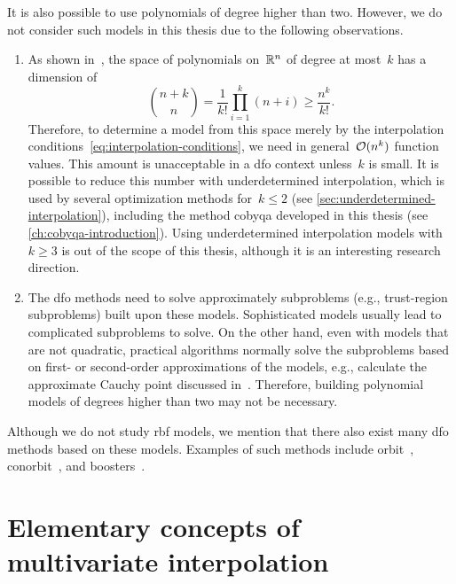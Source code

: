 It is also possible to use polynomials of degree higher than two.
However, we do not consider such models in this thesis due to the following observations.
\begin{enumerate}
    \item As shown in~\cite[Thm.~2.5]{Wendland_2005}, the space of polynomials on~$\mathbb{R}^n$ of degree at most~$k$ has a dimension of
    \begin{equation*}
        \binom{n + k}{n} = \frac{1}{k!} \prod_{i = 1}^k (n + i) \ge \frac{n^k}{k!}.
    \end{equation*}
    Therefore, to determine a model from this space merely by the interpolation conditions~\cref{eq:interpolation-conditions}, we need in general~$\operatorname{\mathcal{O}}(n^k)$ function values.
    This amount is unacceptable in a \gls{dfo} context unless~$k$ is small.
    It is possible to reduce this number with underdetermined interpolation, which is used by several optimization methods for~$k \le 2$ (see \cref{sec:underdetermined-interpolation}), including the method \gls{cobyqa} developed in this thesis (see \cref{ch:cobyqa-introduction}).
    Using underdetermined interpolation models with~$k \ge 3$ is out of the scope of this thesis, although it is an interesting research direction.
    \item The \gls{dfo} methods need to solve approximately subproblems (e.g., trust-region subproblems) built upon these models.
    Sophisticated models usually lead to complicated subproblems to solve.
    On the other hand, even with models that are not quadratic, practical algorithms normally solve the subproblems based on first- or second-order approximations of the models, e.g., calculate the approximate Cauchy point discussed in~\cite[\S~6.3.3]{Conn_Gould_Toint_2000}.
    Therefore, building polynomial models of degrees higher than two may not be necessary.
\end{enumerate}

Although we do not study \gls{rbf} models, we mention that there also exist many \gls{dfo} methods based on these models.
Examples of such methods include \gls{orbit}~\cite{Wild_Regis_Shoemaker_2008}, \gls{conorbit}~\cite{Regis_Wild_2017}, and \gls{boosters}~\cite{Oeuvray_Bierlaire_2009}.

\section{Elementary concepts of multivariate interpolation}
\label{sec:multivariate-interpolation}

